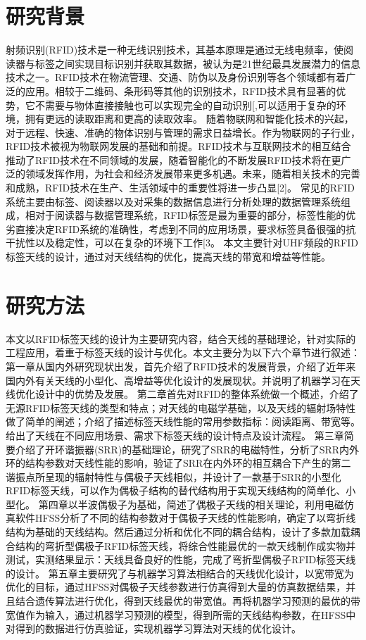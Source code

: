 \documentclass{article}
\begin{document}
	\section{研究背景}
	射频识别(RFID)技术是一种无线识别技术，其基本原理是通过无线电频率，使阅读器与标签之间实现目标识别并获取其数据，被认为是21世纪最具发展潜力的信息技术之一。RFID技术在物流管理、交通、防伪以及身份识别等各个领域都有着广泛的应用。相较于二维码、条形码等其他的识别技术，RFID技术具有显著的优势，它不需要与物体直接接触也可以实现完全的自动识别[,可以适用于复杂的环境，拥有更远的读取距离和更高的读取效率。
	随着物联网和智能化技术的兴起，对于远程、快速、准确的物体识别与管理的需求日益增长。作为物联网的子行业，RFID技术被视为物联网发展的基础和前提。RFID技术与互联网技术的相互结合推动了RFID技术在不同领域的发展，随着智能化的不断发展RFID技术将在更广泛的领域发挥作用，为社会和经济发展带来更多机遇。未来，随着相关技术的完善和成熟，RFID技术在生产、生活领域中的重要性将进一步凸显[2]。
	常见的RFID系统主要由标签、阅读器以及对采集的数据信息进行分析处理的数据管理系统组成，相对于阅读器与数据管理系统，RFID标签是最为重要的部分，标签性能的优劣直接决定RFID系统的准确性，考虑到不同的应用场景，要求标签具备很强的抗干扰性以及稳定性，可以在复杂的环境下工作[3。
	本文主要针对UHF频段的RFID标签天线的设计，通过对天线结构的优化，提高天线的带宽和增益等性能。
	
	\section{研究方法}
    本文以RFID标签天线的设计为主要研究内容，结合天线的基础理论，针对实际的工程应用，着重于标签天线的设计与优化。本文主要分为以下六个章节进行叙述：
    第一章从国内外研究现状出发，首先介绍了RFID技术的发展背景，介绍了近年来国内外有关天线的小型化、高增益等优化设计的发展现状。并说明了机器学习在天线优化设计中的优势及发展。
    第二章首先对RFID的整体系统做一个概述，介绍了无源RFID标签天线的类型和特点；对天线的电磁学基础，以及天线的辐射场特性做了简单的阐述；介绍了描述标签天线性能的常用参数指标：阅读距离、带宽等。给出了天线在不同应用场景、需求下标签天线的设计特点及设计流程。
    第三章简要介绍了开环谐振器(SRR)的基础理论，研究了SRR的电磁特性，分析了SRR内外环的结构参数对天线性能的影响，验证了SRR在内外环的相互耦合下产生的第二谐振点所呈现的辐射特性与偶极子天线相似，并设计了一款基于SRR的小型化RFID标签天线，可以作为偶极子结构的替代结构用于实现天线结构的简单化、小型化。
    第四章以半波偶极子为基础，简述了偶极子天线的相关理论，利用电磁仿真软件HFSS分析了不同的结构参数对于偶极子天线的性能影响，确定了以弯折线结构为基础的天线结构。然后通过分析和优化不同的耦合结构，设计了多款加载耦合结构的弯折型偶极子RFID标签天线，将综合性能最优的一款天线制作成实物并测试，实测结果显示：天线具备良好的性能，完成了弯折型偶极子RFID标签天线的设计。
    第五章主要研究了与机器学习算法相结合的天线优化设计，以宽带宽为优化的目标，通过HFSS对偶极子天线参数进行仿真得到大量的仿真数据结果，并且结合遗传算法进行优化，得到天线最优的带宽值。再将机器学习预测的最优的带宽值作为输入，通过机器学习预测的模型，得到所需的天线结构参数，在HFSS中对得到的数据进行仿真验证，实现机器学习算法对天线的优化设计。
\end{document}
